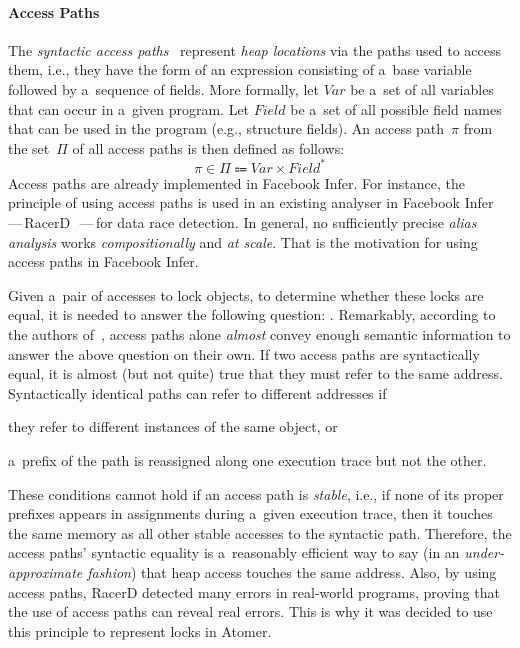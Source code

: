 \paragraph{Access Paths}
The \emph{syntactic access paths}~\cite{accessPath} represent \emph{heap locations} via the paths used to access them, i.e., they have the form of an expression consisting of a~base variable followed by a~sequence of fields. More formally, let $ Var $ be a~set of all variables that can occur in a~given program. Let $ Field $ be a~set of all possible field names that can be used in the program (e.g., structure fields). An access path~$ \pi $ from the set~$ \Pi $ of all access paths is then defined as follows:
$$
    \pi \in \Pi \Coloneqq Var \times Field^*
$$
Access paths are already implemented in Facebook Infer. For instance, the principle of using access paths is used in an existing analyser in Facebook Infer\,---\,RacerD~\cite{racerD, racerDOnline, staticRaceDetectorTruePositives}\,---\,for data race detection. In general, no sufficiently precise \emph{alias analysis} works \emph{compositionally} and \emph{at scale}. That is the motivation for using access paths in Facebook Infer.

Given a~pair of accesses to lock objects, to determine whether these locks are equal, it is needed to answer the following question: . Remarkably, according to the authors of~\cite{racerD}, access paths alone \emph{almost} convey enough semantic information to answer the above question on their own. If two access paths are syntactically equal, it is almost (but not quite) true that they must refer to the same address. Syntactically identical paths can refer to different addresses if
\begin{enuminline}
    \item they refer to different instances of the same object, or

    \item a~prefix of the path is reassigned along one execution trace but not the other.
\end{enuminline}
These conditions cannot hold if an access path is \emph{stable}, i.e., if none of its proper prefixes appears in assignments during a~given execution trace, then it touches the same memory as all other stable accesses to the syntactic path. Therefore, the access paths' syntactic equality is a~reasonably efficient way to say (in an \emph{under-approximate fashion}) that heap access touches the same address. Also, by using access paths, RacerD detected many errors in real-world programs, proving that the use of access paths can reveal real errors. This is why it was decided to use this principle to represent locks in Atomer.

